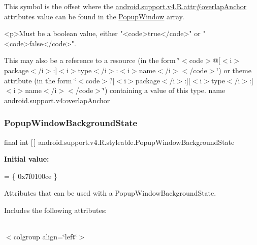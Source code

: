 This symbol is the offset where the \hyperlink{classandroid_1_1support_1_1v4_1_1R_1_1attr_a0c8163501c5bda57b67869aa588edc63}{android.\+support.\+v4.\+R.\+attr\#overlap\+Anchor} attribute\textquotesingle{}s value can be found in the \hyperlink{classandroid_1_1support_1_1v4_1_1R_1_1styleable_ac336c55ce0f18f8d06778e7eab7b5f62}{Popup\+Window} array.

\begin{DoxyVerb}      <p>Must be a boolean value, either "<code>true</code>" or "<code>false</code>".
\end{DoxyVerb}
 

This may also be a reference to a resource (in the form \char`\"{}$<$code$>$@\mbox{[}$<$i$>$package$<$/i$>$\+:\mbox{]}$<$i$>$type$<$/i$>$\+:$<$i$>$name$<$/i$>$$<$/code$>$\char`\"{}) or theme attribute (in the form \char`\"{}$<$code$>$?\mbox{[}$<$i$>$package$<$/i$>$\+:\mbox{]}\mbox{[}$<$i$>$type$<$/i$>$\+:\mbox{]}$<$i$>$name$<$/i$>$$<$/code$>$\char`\"{}) containing a value of this type.  name android.\+support.\+v4\+:overlap\+Anchor \mbox{\label{classandroid_1_1support_1_1v4_1_1R_1_1styleable_a20b84169baa4a240ced79c4184411680}} 
\subsubsection{\texorpdfstring{Popup\+Window\+Background\+State}{PopupWindowBackgroundState}}
{\footnotesize\ttfamily final int \mbox{[}$\,$\mbox{]} android.\+support.\+v4.\+R.\+styleable.\+Popup\+Window\+Background\+State\hspace{0.3cm}{\ttfamily [static]}}

{\bfseries Initial value\+:}
\begin{DoxyCode}
= \{
            0x7f0100ce
        \}
\end{DoxyCode}
Attributes that can be used with a Popup\+Window\+Background\+State. 

Includes the following attributes\+:

\tabulinesep=1mm
\begin{longtabu} spread 0pt [c]{*{0}{|X[-1]}|}
\hline
\end{longtabu}
$<$colgroup align=\char`\"{}left\char`\"{}$>$ 

